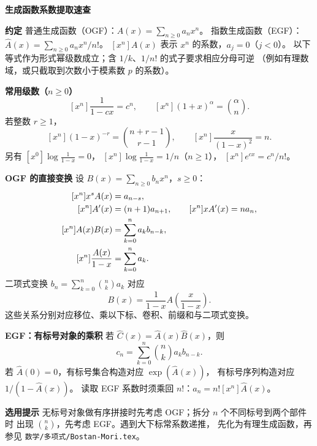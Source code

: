 \textbf{生成函数系数提取速查}

\textbf{约定}
普通生成函数（OGF）：$A(x)=\sum_{n\ge0}a_nx^n$。
指数生成函数（EGF）：$\widehat A(x)=\sum_{n\ge0}a_nx^n/n!$。
$[x^n]A(x)$ 表示 $x^n$ 的系数，$a_j=0$（$j<0$）。
以下等式作为形式幂级数成立；含 $1/k$、$1/n!$ 的式子要求相应分母可逆
（例如有理数域，或只截取到次数小于模素数 $p$ 的系数）。

\textbf{常用级数（$n\ge0$）}
\[
[x^n]\frac1{1-cx}=c^n,\qquad
[x^n](1+x)^\alpha=\binom{\alpha}{n}.
\]
若整数 $r\ge1$，
\[
[x^n](1-x)^{-r}=\binom{n+r-1}{r-1},\qquad
[x^n]\frac{x}{(1-x)^2}=n.
\]
另有 $[x^0]\log\frac1{1-x}=0$，
$[x^n]\log\frac1{1-x}=1/n$（$n\ge1$），
$[x^n]e^{cx}=c^n/n!$。

\textbf{OGF 的直接变换}
设 $B(x)=\sum_{n\ge0}b_nx^n$，$s\ge0$：
\[
\begin{aligned}
\relax[x^n]x^s A(x)&=a_{n-s},\\
[x^n]A'(x)&=(n+1)a_{n+1},\qquad
[x^n]xA'(x)=na_n,\\
[x^n]A(x)B(x)&=\sum_{k=0}^n a_kb_{n-k},\\
[x^n]\frac{A(x)}{1-x}&=\sum_{k=0}^n a_k.
\end{aligned}
\]
二项式变换 $b_n=\sum_{k=0}^n\binom nk a_k$ 对应
\[
B(x)=\frac1{1-x}A\!\left(\frac{x}{1-x}\right).
\]
这些关系分别对应移位、乘以下标、卷积、前缀和与二项式变换。

\textbf{EGF：有标号对象的乘积}
若 $\widehat C(x)=\widehat A(x)\widehat B(x)$，则
\[
c_n=\sum_{k=0}^n\binom nk a_kb_{n-k}.
\]
若 $\widehat A(0)=0$，有标号集合构造对应 $\exp(\widehat A(x))$，
有标号序列构造对应 $1/(1-\widehat A(x))$。
读取 EGF 系数时须乘回 $n!$：$a_n=n![x^n]\widehat A(x)$。

\textbf{选用提示}
无标号对象做有序拼接时先考虑 OGF；拆分 $n$ 个不同标号到两个部件时
出现 $\binom nk$，先考虑 EGF。遇到大下标常系数递推，
先化为有理生成函数，再参见 \texttt{数学/多项式/Bostan-Mori.tex}。
